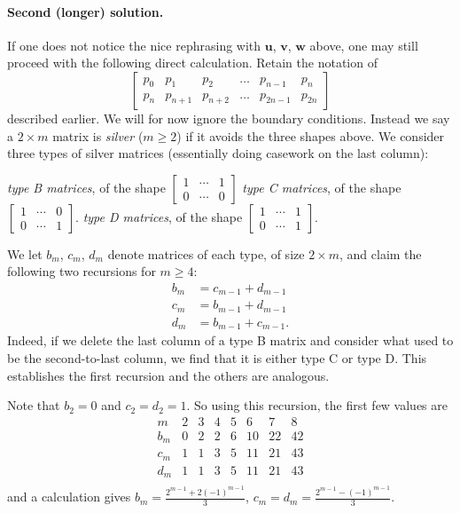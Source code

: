 \documentclass[11pt]{scrartcl}
\begin{document}
\paragraph{Second (longer) solution.}
If one does not notice the nice rephrasing with $\mathbf u$, $\mathbf v$,
$\mathbf w$ above, one may still proceed with the following direct calculation.
Retain the notation of
\[
  \begin{bmatrix}
    p_0 & p_1 & p_2 & \dots & p_{n-1} & p_n \\
    p_n & p_{n+1} & p_{n+2} & \dots & p_{2n-1} & p_{2n}
  \end{bmatrix}
\]
described earlier.
We will for now ignore the boundary conditions.
Instead we say a $2 \times m$ matrix is \emph{silver} ($m \ge 2$)
if it avoids the three shapes above.
We consider three types of silver matrices
(essentially doing casework on the last column):
\begin{itemize}
\ii \emph{type B matrices}, of the shape
  $\begin{bmatrix}
    1 & \dotsb & 1 \\
    0 & \dotsb & 0
  \end{bmatrix}$
\ii \emph{type C matrices}, of the shape
  $\begin{bmatrix}
    1 & \dotsb & 0 \\
    0 & \dotsb & 1
  \end{bmatrix}$.
\ii \emph{type D matrices}, of the shape
  $\begin{bmatrix}
    1 & \dotsb & 1 \\
    0 & \dotsb & 1
  \end{bmatrix}$.
\end{itemize}
We let $b_m$, $c_m$, $d_m$
denote matrices of each type, of size $2 \times m$,
and claim the following two recursions for $m \ge 4$:
\begin{align*}
  b_m &= c_{m-1} + d_{m-1} \\
  c_m &= b_{m-1} + d_{m-1} \\
  d_m &= b_{m-1} + c_{m-1}.
\end{align*}
Indeed, if we delete the last column of a type B matrix
and consider what used to be the second-to-last column,
we find that it is either type C or type D.
This establishes the first recursion and the others are analogous.

Note that $b_2 = 0$ and $c_2 = d_2 = 1$.
So using this recursion, the first few values are
\[
  \begin{array}{rrrrrrrr}
    m  & 2 & 3 & 4 & 5 &  6 &  7 &  8 \\ \hline
    b_m & 0 & 2 & 2 & 6 & 10 & 22 & 42 \\
    c_m & 1 & 1 & 3 & 5 & 11 & 21 & 43 \\
    d_m & 1 & 1 & 3 & 5 & 11 & 21 & 43 \\
  \end{array}
\]
and a calculation gives $b_m = \frac{2^{m-1} + 2(-1)^{m-1}}{3}$,
$c_m = d_m = \frac{2^{m-1} - (-1)^{m-1}}{3}$.
\end{document}
